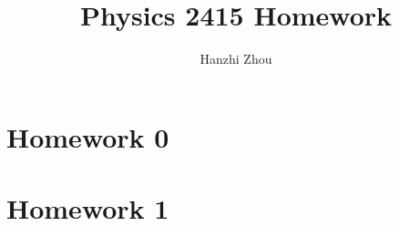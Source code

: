 \documentclass[12pt]{article}
\title{Physics 2415 Homework}
\author{Hanzhi Zhou}
\begin{document}
\maketitle
\thispagestyle{empty}

\doublespacing
\tableofcontents
\newpage
\singlespacing

\section{Homework 0}


\section{Homework 1}






\end{document}
